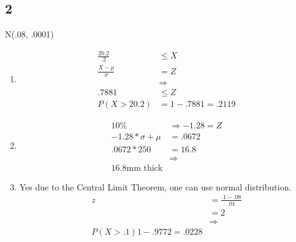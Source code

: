 \documentclass[12pt]{report}
\begin{document}
   \subsection*{2}
         N(.08, .0001)
   \begin{enumerate}[label={\bf \alph*}]
      \item

      \begin{align*}
         \frac{20.2}{.2}     &\leq X\\
         \frac{X-\mu}{\sigma}&=Z\\
                             &\Rightarrow\\
                       .7881 &\leq Z\\
                       P(X>20.2)&=1-.7881=.2119
      \end{align*}
      \item
      \begin{align*}
         10\%&\Rightarrow -1.28=Z\\
         -1.28*\sigma+\mu&=.0672\\
         .0672*250&=16.8\\
         &\Rightarrow\\
         16.8 \text{mm thick}
      \end{align*}
      \item
      Yes due to the Central Limit Theorem, one can use normal distribution.
      \begin{align*}
       z&=\frac{.1-.08}{.01}\\
        &=2\\
        &\Rightarrow\\
        P(X>.1)1-.9772=.0228
      \end{align*}
   \end{enumerate}
\end{document}
